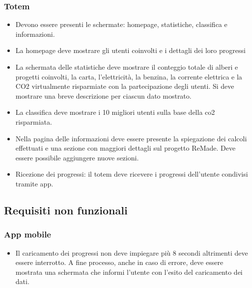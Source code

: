 \subsubsection{Totem}
\begin{itemize}
    \item Devono essere presenti le schermate: homepage, statistiche, classifica e informazioni.
    \item La homepage deve mostrare gli utenti coinvolti e i dettagli dei loro progressi 
    \item La schermata delle statistiche deve mostrare il conteggio totale di alberi e progetti coinvolti, la carta, l'elettricità, la benzina, la corrente elettrica e la CO2 virtualmente risparmiate con la partecipazione degli utenti. Si deve mostrare una breve descrizione per ciascun dato mostrato.
    \item La classifica deve mostrare i 10 migliori utenti sulla base della co2 risparmiata.
    \item Nella pagina delle informazioni deve essere presente la spiegazione dei calcoli effettuati e una sezione con maggiori dettagli sul progetto ReMade. Deve essere possibile aggiungere nuove sezioni.
    \item Ricezione dei progressi: il totem deve ricevere i progressi dell'utente condivisi tramite app.
\end{itemize}
\subsection{Requisiti non funzionali}
\subsubsection{App mobile}
\begin{itemize}
    \item Il caricamento dei progressi non deve impiegare più 8 secondi altrimenti deve essere interrotto. A fine processo, anche in caso di errore, deve essere mostrata una schermata che informi l'utente con l'esito del caricamento dei dati.
\end{itemize}

